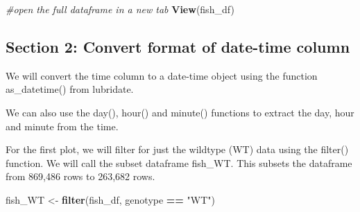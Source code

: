 \documentclass[
]{article}
\newenvironment{Shaded}{\begin{snugshade}}{\end{snugshade}}
\newcommand{\CommentTok}[1]{\textcolor[rgb]{0.56,0.35,0.01}{\textit{#1}}}
\newcommand{\FunctionTok}[1]{\textcolor[rgb]{0.13,0.29,0.53}{\textbf{#1}}}
\newcommand{\NormalTok}[1]{#1}
\newcommand{\OtherTok}[1]{\textcolor[rgb]{0.56,0.35,0.01}{#1}}
\newcommand{\SpecialCharTok}[1]{\textcolor[rgb]{0.81,0.36,0.00}{\textbf{#1}}}
\newcommand{\StringTok}[1]{\textcolor[rgb]{0.31,0.60,0.02}{#1}}
\begin{document}
\begin{Shaded}
\begin{Highlighting}[]
\CommentTok{\#open the full dataframe in a new tab}
\FunctionTok{View}\NormalTok{(fish\_df)}
\end{Highlighting}
\end{Shaded}

\hypertarget{section-2-convert-format-of-date-time-column}{%
\subsection{Section 2: Convert format of date-time
column}\label{section-2-convert-format-of-date-time-column}}

We will convert the time column to a date-time object using the function
as\_datetime() from lubridate.

We can also use the day(), hour() and minute() functions to extract the
day, hour and minute from the time.

\begin{Shaded}
\end{Shaded}

For the first plot, we will filter for just the wildtype (WT) data using
the filter() function. We will call the subset dataframe fish\_WT. This
subsets the dataframe from 869,486 rows to 263,682 rows.

\begin{Shaded}
\begin{Highlighting}[]
\NormalTok{fish\_WT }\OtherTok{\textless{}{-}} \FunctionTok{filter}\NormalTok{(fish\_df, genotype }\SpecialCharTok{==} \StringTok{"WT"}\NormalTok{)}
\end{Highlighting}
\end{Shaded}
\end{document}
